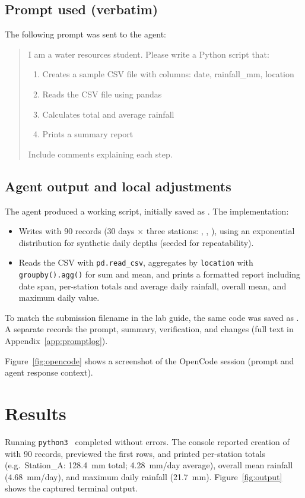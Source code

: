 \documentclass[11pt,a4paper]{article}
\begin{document}
\subsection{Prompt used (verbatim)}
The following prompt was sent to the agent:

\begin{quote}\small
I am a water resources student. Please write a Python script that:
\begin{enumerate}[noitemsep]
  \item Creates a sample CSV file with columns: date, rainfall\_mm, location
  \item Reads the CSV file using pandas
  \item Calculates total and average rainfall
  \item Prints a summary report
\end{enumerate}
Include comments explaining each step.
\end{quote}

\subsection{Agent output and local adjustments}
The agent produced a working script, initially saved as . The implementation:
\begin{itemize}[noitemsep]
  \item Writes  with 90 records (30 days $\times$ three stations: , , ), using an exponential distribution for synthetic daily depths (seeded for repeatability).
  \item Reads the CSV with \texttt{pd.read\_csv}, aggregates by \texttt{location} with \texttt{groupby().agg()} for sum and mean, and prints a formatted report including date span, per-station totals and average daily rainfall, overall mean, and maximum daily value.
\end{itemize}
To match the submission filename in the lab guide, the same code was saved as . A separate  records the prompt, summary, verification, and changes (full text in Appendix~\ref{app:promptlog}).

Figure~\ref{fig:opencode} shows a screenshot of the OpenCode session (prompt and agent response context).

\section{Results}
Running \texttt{python3}~ completed without errors. The console reported creation of  with 90 records, previewed the first rows, and printed per-station totals (e.g.\ Station\_A: 128.4~mm total; 4.28~mm/day average), overall mean rainfall (4.68~mm/day), and maximum daily rainfall (21.7~mm). Figure~\ref{fig:output} shows the captured terminal output.
\end{document}
